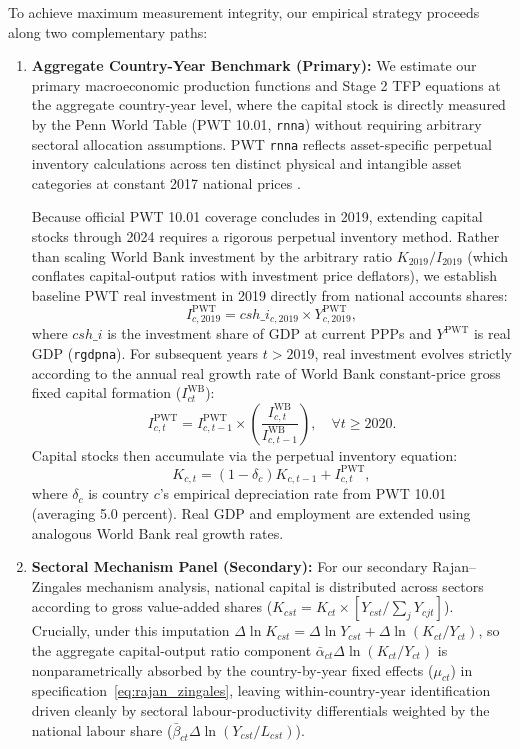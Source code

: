 \documentclass[11pt,a4paper]{article}
\begin{document}
To achieve maximum measurement integrity, our empirical strategy proceeds along two complementary paths:
\begin{enumerate}
    \item \textbf{Aggregate Country-Year Benchmark (Primary):} We estimate our primary macroeconomic production functions and Stage 2 TFP equations at the aggregate country-year level, where the capital stock is directly measured by the Penn World Table (PWT 10.01, \texttt{rnna}) without requiring arbitrary sectoral allocation assumptions. PWT \texttt{rnna} reflects asset-specific perpetual inventory calculations across ten distinct physical and intangible asset categories at constant 2017 national prices \citep{feenstra2015}.
    
    Because official PWT 10.01 coverage concludes in 2019, extending capital stocks through 2024 requires a rigorous perpetual inventory method. Rather than scaling World Bank investment by the arbitrary ratio $K_{2019}/I_{2019}$ (which conflates capital-output ratios with investment price deflators), we establish baseline PWT real investment in 2019 directly from national accounts shares:
    \begin{equation}
        I_{c, 2019}^{\text{PWT}} = csh\_i_{c, 2019} \times Y_{c, 2019}^{\text{PWT}},
    \end{equation}
    where $csh\_i$ is the investment share of GDP at current PPPs and $Y^{\text{PWT}}$ is real GDP (\texttt{rgdpna}). For subsequent years $t > 2019$, real investment evolves strictly according to the annual real growth rate of World Bank constant-price gross fixed capital formation ($I_{ct}^{\text{WB}}$):
    \begin{equation}
        I_{c, t}^{\text{PWT}} = I_{c, t-1}^{\text{PWT}} \times \left( \frac{I_{c, t}^{\text{WB}}}{I_{c, t-1}^{\text{WB}}} \right), \quad \forall t \ge 2020.
    \end{equation}
    Capital stocks then accumulate via the perpetual inventory equation:
    \begin{equation}
        K_{c, t} = (1 - \delta_c) K_{c, t-1} + I_{c, t}^{\text{PWT}},
    \end{equation}
    where $\delta_c$ is country $c$'s empirical depreciation rate from PWT 10.01 (averaging 5.0 percent). Real GDP and employment are extended using analogous World Bank real growth rates.
    
    \item \textbf{Sectoral Mechanism Panel (Secondary):} For our secondary Rajan--Zingales mechanism analysis, national capital is distributed across sectors according to gross value-added shares ($K_{cst} = K_{ct} \times [Y_{cst}/\sum_j Y_{cjt}]$). Crucially, under this imputation $\Delta \ln K_{cst} = \Delta \ln Y_{cst} + \Delta \ln(K_{ct}/Y_{ct})$, so the aggregate capital-output ratio component $\bar{\alpha}_{ct}\Delta \ln(K_{ct}/Y_{ct})$ is nonparametrically absorbed by the country-by-year fixed effects ($\mu_{ct}$) in specification~\eqref{eq:rajan_zingales}, leaving within-country-year identification driven cleanly by sectoral labour-productivity differentials weighted by the national labour share ($\bar{\beta}_{ct}\Delta \ln(Y_{cst}/L_{cst})$).
\end{enumerate}
\end{document}
